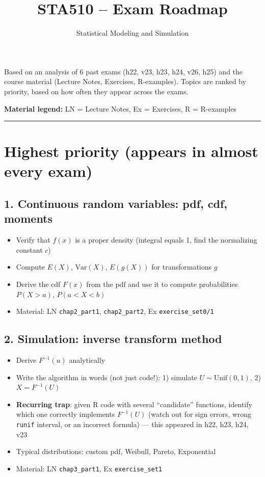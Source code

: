 \documentclass[11pt]{article}
\title{\textbf{STA510 -- Exam Roadmap}}
\author{Statistical Modeling and Simulation}
\date{}
\begin{document}
\maketitle

\noindent Based on an analysis of 6 past exams (h22, v23, h23, h24, v26, h25) and the
course material (Lecture Notes, Exercises, R-examples). Topics are ranked by priority,
based on how often they appear across the exams.

\medskip
\noindent \textbf{Material legend:} LN = Lecture Notes, Ex = Exercises, R = R-examples

\bigskip
\hrule
\bigskip

\section*{\textcolor{prihigh}{Highest priority (appears in almost every exam)}}

\subsection*{1. Continuous random variables: pdf, cdf, moments}
\begin{itemize}[leftmargin=*]
  \item Verify that $f(x)$ is a proper density (integral equals 1, find the normalizing constant $c$)
  \item Compute $E(X)$, $\mathrm{Var}(X)$, $E(g(X))$ for transformations $g$
  \item Derive the cdf $F(x)$ from the pdf and use it to compute probabilities $P(X>a)$, $P(a<X<b)$
  \item Material: LN \texttt{chap2\_part1}, \texttt{chap2\_part2}, Ex \texttt{exercise\_set0/1}
\end{itemize}

\subsection*{2. Simulation: inverse transform method}
\begin{itemize}[leftmargin=*]
  \item Derive $F^{-1}(u)$ analytically
  \item Write the algorithm in words (not just code!): 1) simulate $U\sim \mathrm{Unif}(0,1)$, 2) $X = F^{-1}(U)$
  \item \textbf{Recurring trap}: given R code with several ``candidate'' functions, identify
  which one correctly implements $F^{-1}(U)$ (watch out for sign errors, wrong \texttt{runif}
  interval, or an incorrect formula) --- this appeared in h22, h23, h24, v23
  \item Typical distributions: custom pdf, Weibull, Pareto, Exponential
  \item Material: LN \texttt{chap3\_part1}, Ex \texttt{exercise\_set1}
\end{itemize}
\end{document}
